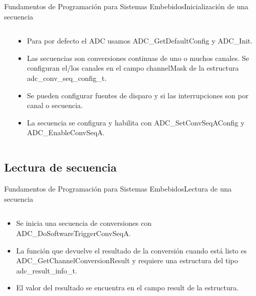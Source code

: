 \documentclass[aspectratio=169, xcolor=dvipsnames]{beamer}
\begin{document}
\begin{frame}{Fundamentos de Programación para Sistemas Embebidos}{Inicialización de una secuencia}
\begin{columns}
\begin{column}{0.5\textwidth}

\end{column}
\begin{column}{0.5\textwidth}
\begin{itemize}
    \item Para por defecto el ADC usamos \textcolor{myblue}{ADC\_GetDefaultConfig} y \textcolor{myblue}{ADC\_Init}.
    \item Las secuencias son conversiones continuas de uno o muchos canales. Se configuran el/los canales en el campo \textcolor{myblue}{channelMask} de la estructura \textcolor{myblue}{adc\_conv\_seq\_config\_t}.
    \item Se pueden configurar fuentes de disparo y si las interrupciones son por canal o secuencia.
    \item La secuencia se configura y habilita con \textcolor{myblue}{ADC\_SetConvSeqAConfig} y \textcolor{myblue}{ADC\_EnableConvSeqA}.
\end{itemize}
\end{column}
\end{columns}
\end{frame}

\subsection{Lectura de secuencia}
\begin{frame}{Fundamentos de Programación para Sistemas Embebidos}{Lectura de una secuencia}
\begin{columns}
\begin{column}{0.5\textwidth}
\begin{itemize}
    \item Se inicia una secuencia de conversiones con \textcolor{myblue}{ADC\_DoSoftwareTriggerConvSeqA}.
    \item La función que devuelve el resultado de la conversión cuando está listo es \textcolor{myblue}{ADC\_GetChannelConversionResult} y requiere una estructura del tipo \textcolor{myblue}{adc\_result\_info\_t}.
    \item El valor del resultado se encuentra en el campo \textcolor{myblue}{result} de la estructura.
\end{itemize}
\end{column}
\begin{column}{0.5\textwidth}

\end{column}
\end{columns}
\end{frame}
\end{document}
